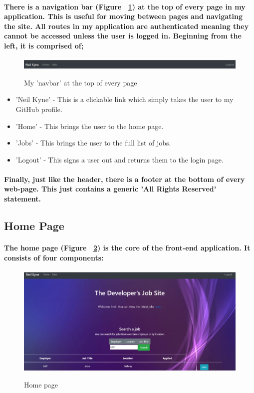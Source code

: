 \paragraph{There is a navigation bar (Figure ~\ref{header_label}) at the top of every page in my application. This is useful for moving between pages and navigating the site. All routes in my application are authenticated meaning they cannot be accessed unless the user is logged in. Beginning from the left, it is comprised of;}
\begin{figure}[ht]
    \centering
    \includegraphics[scale=0.35]{Images/header.png} 
    \label{header_label}
    \caption{My 'navbar' at the top of every page}
\end{figure}
\begin{itemize}
    \item 'Neil Kyne' - This is a clickable link which simply takes the user to my GitHub profile.
    \item 'Home' - This brings the user to the home page.
    \item 'Jobs' - This brings the user to the full list of jobs.
    \item 'Logout' - This signs a user out and returns them to the login page.
\end{itemize}
\paragraph{Finally, just like the header, there is a footer at the bottom of every web-page. This just contains a generic 'All Rights Reserved' statement.}

\subsection{Home Page}
\paragraph{The home page (Figure ~\ref{home_label}) is the core of the front-end application. It consists of four components:}
\begin{figure}[ht]
    \centering
    \includegraphics[scale=0.3]{Images/home.png} 
    \label{home_label}
    \caption{Home page}
\end{figure}
